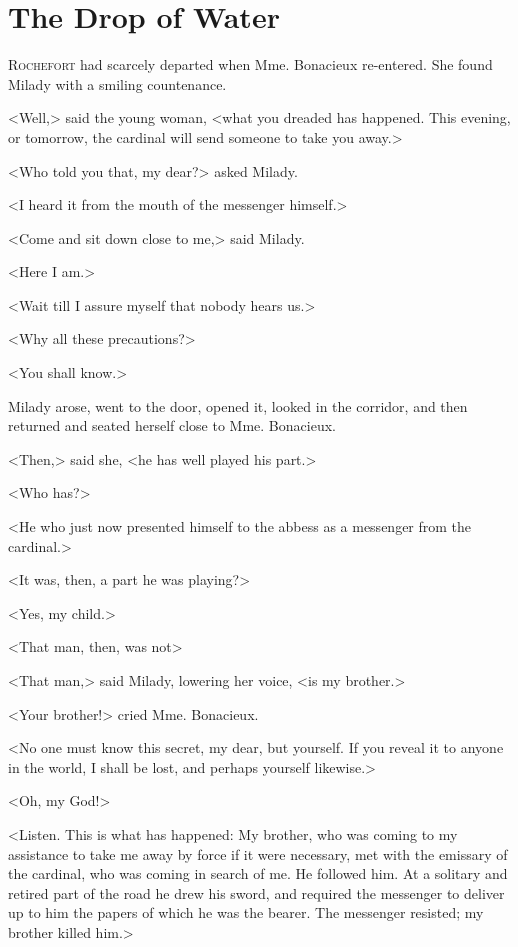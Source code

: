 
\chapter{The Drop of Water}

\lettrine[]{R}{ochefort} had scarcely departed when Mme. Bonacieux re-entered. She found Milady with a smiling countenance. 

<Well,> said the young woman, <what you dreaded has happened. This evening, or tomorrow, the cardinal will send someone to take you away.> 

<Who told you that, my dear?> asked Milady. 

<I heard it from the mouth of the messenger himself.> 

<Come and sit down close to me,> said Milady. 

<Here I am.> 

<Wait till I assure myself that nobody hears us.> 

<Why all these precautions?> 

<You shall know.> 

Milady arose, went to the door, opened it, looked in the corridor, and then returned and seated herself close to Mme. Bonacieux. 

<Then,> said she, <he has well played his part.> 

<Who has?> 

<He who just now presented himself to the abbess as a messenger from the cardinal.> 

<It was, then, a part he was playing?> 

<Yes, my child.> 

<That man, then, was not\longdash> 

<That man,> said Milady, lowering her voice, <is my brother.> 

<Your brother!> cried Mme. Bonacieux. 

<No one must know this secret, my dear, but yourself. If you reveal it to anyone in the world, I shall be lost, and perhaps yourself likewise.> 

<Oh, my God!> 

<Listen. This is what has happened: My brother, who was coming to my assistance to take me away by force if it were necessary, met with the emissary of the cardinal, who was coming in search of me. He followed him. At a solitary and retired part of the road he drew his sword, and required the messenger to deliver up to him the papers of which he was the bearer. The messenger resisted; my brother killed him.> 


